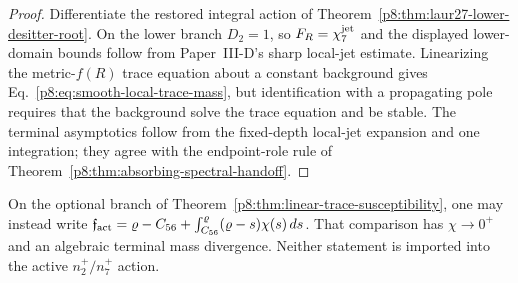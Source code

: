 \documentclass[12pt,a4paper]{article}
\begin{document}
\begin{proof}
Differentiate the restored integral action of
Theorem~\ref{p8:thm:laur27-lower-desitter-root}.  On the lower branch
\(D_2=1\), so \(F_R=\chi_7^{\rm jet}\) and the displayed lower-domain
bounds follow from Paper~III-D's sharp local-jet estimate.  Linearizing the
metric-\(f(R)\) trace equation about a constant background gives
Eq.~\eqref{p8:eq:smooth-local-trace-mass}, but identification with a
propagating pole requires that the background solve the trace equation and be
stable.  The terminal asymptotics follow from the fixed-depth local-jet
expansion and one integration; they agree with the endpoint-role rule of
Theorem~\ref{p8:thm:absorbing-spectral-handoff}.
\end{proof}

\begin{remark}
On the optional branch of
Theorem~\ref{p8:thm:linear-trace-susceptibility}, one may instead write
\(\mathfrak f_{\rm act}
=\varrho-C_{56}+\int_{C_{56}}^\varrho(\varrho-s)\chi(s)\,ds\).
That comparison has \(\chi\to0^+\) and an algebraic terminal mass divergence.
Neither statement is imported into the active \(n_2^+/n_7^+\) action.
\end{remark}
\end{document}
